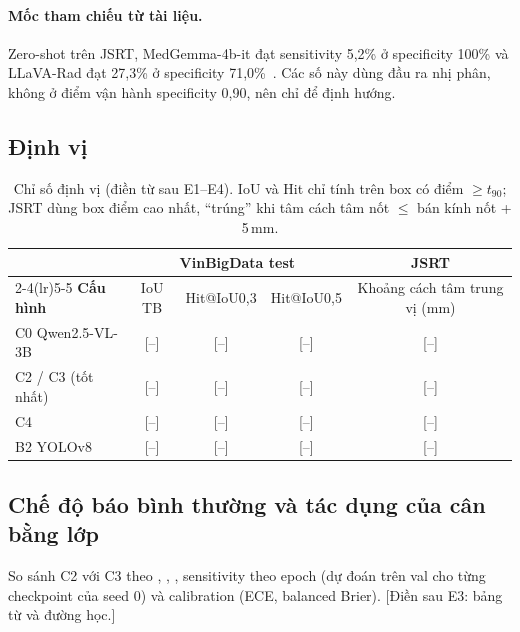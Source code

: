\paragraph{Mốc tham chiếu từ tài liệu.} Zero-shot trên JSRT, MedGemma-4b-it đạt sensitivity 5,2\% ở specificity
100\% và LLaVA-Rad đạt 27,3\% ở specificity 71,0\%~\cite{nishio2026zeroshot}. Các số này dùng đầu ra nhị phân,
không ở điểm vận hành specificity 0,90, nên chỉ để định hướng.

\subsection{Định vị}

\begin{table}[H]
\centering
\caption[Chỉ số định vị]{Chỉ số định vị (điền từ  sau E1--E4). IoU và Hit chỉ tính trên box có điểm $\ge t_{90}$;
JSRT dùng box điểm cao nhất, ``trúng'' khi tâm cách tâm nốt $\le$ bán kính nốt + 5\,mm.}
\label{tab:loc}
\small
\begin{tabular}{@{}l ccc c@{}}
\toprule
& \multicolumn{3}{c}{\textbf{VinBigData test}} & \textbf{JSRT} \\
\cmidrule(lr){2-4}\cmidrule(lr){5-5}
\textbf{Cấu hình} & IoU TB & Hit@IoU0,3 & Hit@IoU0,5 & Khoảng cách tâm trung vị (mm) \\
\midrule
C0 Qwen2.5-VL-3B & \textcolor{badred}{[--]} & \textcolor{badred}{[--]} & \textcolor{badred}{[--]} & \textcolor{badred}{[--]} \\
C2 / C3 (tốt nhất) & \textcolor{badred}{[--]} & \textcolor{badred}{[--]} & \textcolor{badred}{[--]} & \textcolor{badred}{[--]} \\
C4 & \textcolor{badred}{[--]} & \textcolor{badred}{[--]} & \textcolor{badred}{[--]} & \textcolor{badred}{[--]} \\
B2 YOLOv8 & \textcolor{badred}{[--]} & \textcolor{badred}{[--]} & \textcolor{badred}{[--]} & \textcolor{badred}{[--]} \\
\bottomrule
\end{tabular}
\end{table}

\subsection{Chế độ báo bình thường và tác dụng của cân bằng lớp}

So sánh C2 với C3 theo , , , sensitivity theo epoch (dự đoán
 trên val cho từng checkpoint của seed 0) và calibration (ECE, balanced Brier).
\textcolor{badred}{[Điền sau E3: bảng từ  và đường học.]}

